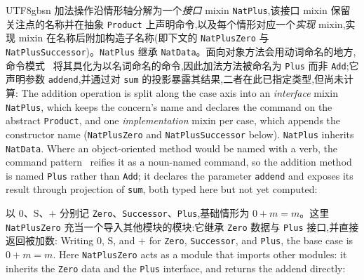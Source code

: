 \begin{CJK*}{UTF8}{gbsn}
\ifPaperChinese
加法操作沿情形轴分解为一个\emph{接口} mixin \texttt{NatPlus},该接口 mixin 保留关注点的名称并在抽象 \texttt{Product} 上声明命令,以及每个情形对应一个\emph{实现} mixin,实现 mixin 在名称后附加构造子名称(即下文的 \texttt{NatPlusZero} 与 \texttt{NatPlusSuccessor})。\texttt{NatPlus} 继承 \texttt{NatData}。面向对象方法会用动词命名的地方,命令模式~\cite{gamma1994-design-patterns} 将其具化为以名词命名的命令,因此加法方法被命名为 \texttt{Plus} 而非 \texttt{Add};它声明参数 \texttt{addend},并通过对 \texttt{sum} 的投影暴露其结果,二者在此已指定类型,但尚未计算:
\else
The addition operation is split along the case axis into an \emph{interface}
mixin \texttt{NatPlus}, which keeps the concern's name and declares the command
on the abstract \texttt{Product}, and one \emph{implementation} mixin per case,
which appends the constructor name (\texttt{NatPlusZero} and
\texttt{NatPlusSuccessor} below). \texttt{NatPlus} inherits
\texttt{NatData}. Where an
object-oriented method would be named with a verb, the command
pattern~\cite{gamma1994-design-patterns} reifies it as a noun-named command, so
the addition method is named \texttt{Plus} rather than \texttt{Add}; it declares
the parameter \texttt{addend} and exposes its result through projection
of \texttt{sum}, both typed here but not yet computed:
\fi
{}

\ifPaperChinese
  以 $0$、$\mathrm{S}$、$+$ 分别记 \texttt{Zero}、\texttt{Successor}、\texttt{Plus},基础情形为 $0 + m = m$。这里 \texttt{NatPlusZero} 充当一个导入其他模块的模块:它继承 \texttt{Zero} 数据与 \texttt{Plus} 接口,并直接返回被加数:
  \else
  Writing $0$, $\mathrm{S}$, and $+$ for \texttt{Zero}, \texttt{Successor}, and \texttt{Plus}, the base case is $0 + m = m$. Here \texttt{NatPlusZero} acts as a module that
  imports other modules: it inherits the \texttt{Zero} data and the \texttt{Plus}
  interface, and returns the addend directly:
  \fi
{}


\end{CJK*}
